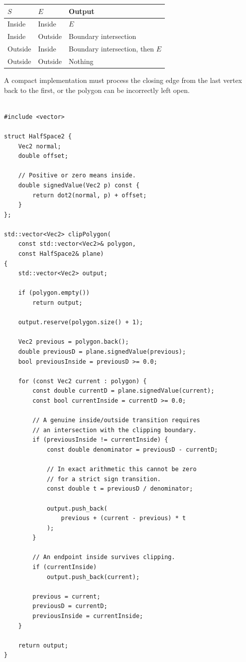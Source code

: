 {\def\LTcaptype{none} %
\begin{longtable}[]{@{}lll@{}}
\toprule\noalign{}
\(S\) & \(E\) & Output \\
\midrule\noalign{}
\endhead
\bottomrule\noalign{}
\endlastfoot
Inside & Inside & \(E\) \\
Inside & Outside & Boundary intersection \\
Outside & Inside & Boundary intersection, then \(E\) \\
Outside & Outside & Nothing \\
\end{longtable}
}

A compact implementation must process the closing edge from the last vertex back to the first, or the polygon can be incorrectly left open.

\begin{verbatim}

#include <vector>

struct HalfSpace2 {
    Vec2 normal;
    double offset;

    // Positive or zero means inside.
    double signedValue(Vec2 p) const {
        return dot2(normal, p) + offset;
    }
};

std::vector<Vec2> clipPolygon(
    const std::vector<Vec2>& polygon,
    const HalfSpace2& plane)
{
    std::vector<Vec2> output;

    if (polygon.empty())
        return output;

    output.reserve(polygon.size() + 1);

    Vec2 previous = polygon.back();
    double previousD = plane.signedValue(previous);
    bool previousInside = previousD >= 0.0;

    for (const Vec2 current : polygon) {
        const double currentD = plane.signedValue(current);
        const bool currentInside = currentD >= 0.0;

        // A genuine inside/outside transition requires
        // an intersection with the clipping boundary.
        if (previousInside != currentInside) {
            const double denominator = previousD - currentD;

            // In exact arithmetic this cannot be zero
            // for a strict sign transition.
            const double t = previousD / denominator;

            output.push_back(
                previous + (current - previous) * t
            );
        }

        // An endpoint inside survives clipping.
        if (currentInside)
            output.push_back(current);

        previous = current;
        previousD = currentD;
        previousInside = currentInside;
    }

    return output;
}
\end{verbatim}


